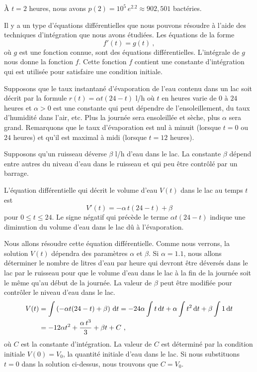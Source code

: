 {\begin{egg}[\life]
À $t=2$ heures, nous avons $p(2) = 10^5 \,e^{2.2} \approx 902,501$
bactéries.
\end{egg}

Il y a un type d'équations différentielles que nous pouvons résoudre à
l'aide des techniques d'intégration que nous avons étudiées.  Les
équations de la forme
\[
f'(t) = g(t) \ ,
\]
où $g$ est une fonction connue, sont des équations différentielles.
L'intégrale de $g$ nous donne la fonction $f$.  Cette fonction $f$
contient une constante d'intégration qui est utilisée pour satisfaire
une condition initiale.

\begin{egg}
Supposons que le taux instantané d'évaporation de l'eau contenu dans
un lac soit décrit par la formule $r(t) = \alpha t (24-t)$ l/h où $t$
en heures varie de $0$ à $24$ heures et $\alpha>0$ est une constante
qui peut dépendre de l'ensoleillement, du taux d'humidité dans l'air,
etc.  Plus la journée sera ensoleillée et sèche, plus $\alpha$ sera
grand.  Remarquons que le taux d'évaporation est nul à minuit (lorsque
$t=0$ ou $24$ heures) et qu'il est maximal à midi (lorsque $t=12$
heures).

Supposons qu'un ruisseau déverse $\beta$ l/h d'eau dans le lac.  La
constante $\beta$ dépend entre autres du niveau d'eau dans le
ruisseau et qui peu être contrôlé par un barrage.

L'équation différentielle qui décrit le volume d'eau $V(t)$ dans
le lac au temps $t$ est
\[
V'(t) = - \alpha\, t(24-t) + \beta
\]
pour $0\leq t \leq 24$.  Le signe négatif qui précède le terme
$\alpha t (24-t)$ indique une diminution du volume d'eau dans le lac
dû à l'évaporation.

Nous allons résoudre cette équation différentielle.  Comme nous
verrons, la solution $V(t)$ dépendra des paramètres $\alpha$ et
$\beta$.  Si $\alpha = 1.1$, nous allons déterminer le nombre de
litres d'eau par heure qui devront être déversés dans le lac par le
ruisseau pour que le volume d'eau dans le lac à la fin de la journée
soit le même qu'au début de la journée.  La valeur de $\beta$ peut
être modifiée pour contrôler le niveau d'eau dans le lac.
\begin{align*}
V(t) &= \int \left( -\alpha t (24-t) + \beta \right) \,\mathrm{d}t
= -24 \alpha \int t  \,\mathrm{d}t +\alpha \int t^2  \,\mathrm{d}t
+ \beta \int 1  \,\mathrm{d}t \\
&= -12 \alpha t^2 + \frac{\alpha \,t^3}{3} + \beta t + C \ ,
\end{align*}
où $C$ est la constante d'intégration.  La valeur de $C$ est déterminé
par la condition initiale $V(0) = V_0$, la quantité initiale d'eau
dans le lac.  Si nous substituons $t=0$ dans la solution ci-dessus, nous
trouvons que $C = V_0$.


\end{egg}}
